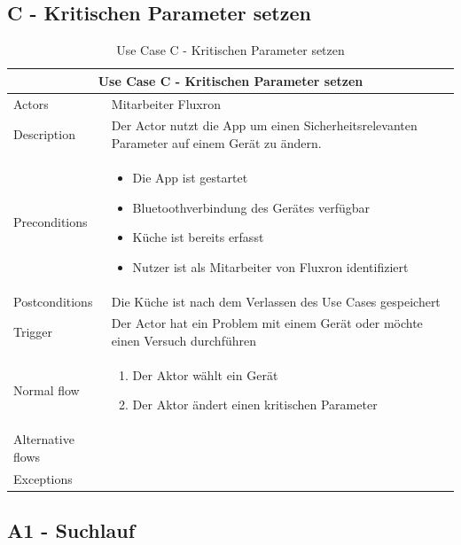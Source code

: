 \subsection{C - Kritischen Parameter setzen}
\label{subsec:C - Kritischen Parameter setzen}

\begin{table}[H]
\begin{tabular}{|p{3cm}|p{10cm}|}
  \hline
  \multicolumn{2}{|c|}{Use Case C - Kritischen Parameter setzen}
  \\\hline
  	Actors
  &
  	Mitarbeiter Fluxron
  \\\hline
  	Description 
  &
  	Der Actor nutzt die App um einen Sicherheitsrelevanten Parameter auf einem Gerät zu ändern.
  \\\hline
  	Preconditions 
  & 
  	\begin{itemize}
	  \item Die App ist gestartet
	  \item Bluetoothverbindung des Gerätes verfügbar
	  \item Küche ist bereits erfasst
      \item Nutzer ist als Mitarbeiter von Fluxron identifiziert
  	\end{itemize}
  \\\hline
  	Postconditions
  &
    Die Küche ist nach dem Verlassen des Use Cases gespeichert
  \\\hline
  	Trigger
  &
    Der Actor hat ein Problem mit einem Gerät oder möchte einen Versuch durchführen
  \\\hline
  	Normal flow
  &
	\begin{enumerate}
	  \item Der Aktor wählt ein Gerät
 	  \item Der Aktor ändert einen kritischen Parameter
	\end{enumerate}
  \\\hline
    Alternative flows
  &

  \\\hline
    Exceptions
  &
    
  \\\hline
\end{tabular}
\caption{Use Case C - Kritischen Parameter setzen}
\end{table}

\subsection{A1 - Suchlauf}
\label{subsec:A1 - Suchlauf}


